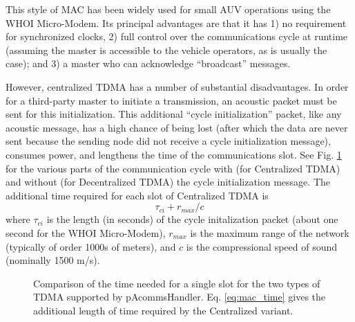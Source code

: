 \documentclass[11pt, letterpaper, oneside]{memoir}
\begin{document}
This style of MAC has been widely used for small AUV operations using the WHOI Micro-Modem. Its principal advantages are that it has 1) no requirement for synchronized clocks, 2) full control over the communications cycle at runtime (assuming the master is accessible to the vehicle operators, as is usually the case); and 3) a master who can acknowledge ``broadcast'' messages. 

However, centralized TDMA has a number of substantial disadvantages. In order for a third-party master to initiate a transmission, an acoustic packet must be sent for this initialization. This additional ``cycle initialization'' packet, like any acoustic message, has a high chance of being lost (after which the data are never sent because the sending node did not receive a cycle initialization message), consumes power, and lengthens the time of the communications slot. See Fig. \ref{fig:slots} for the various parts of the communication cycle with (for Centralized TDMA) and without (for Decentralized TDMA) the cycle initialization message. The additional time required for each slot of Centralized TDMA is
\begin{equation}\label{eq:mac_time}
\tau_{ci} + r_{max}/c
\end{equation}
where $\tau_{ci}$ is the length (in seconds) of the cycle initalization packet (about one second for the WHOI Micro-Modem), $r_{max}$ is the maximum range of the network (typically of order 1000s of meters), and $c$ is the compressional speed of sound (nominally 1500 m/s).

\begin{figure}
	\centering
\centerline{\hfil
	}
\caption{Comparison of the time needed for a single slot for the two types of TDMA supported by pAcommsHandler. Eq. \ref{eq:mac_time} gives the additional length of time required by the Centralized variant.}
\label{fig:slots}
\end{figure}
\end{document}
